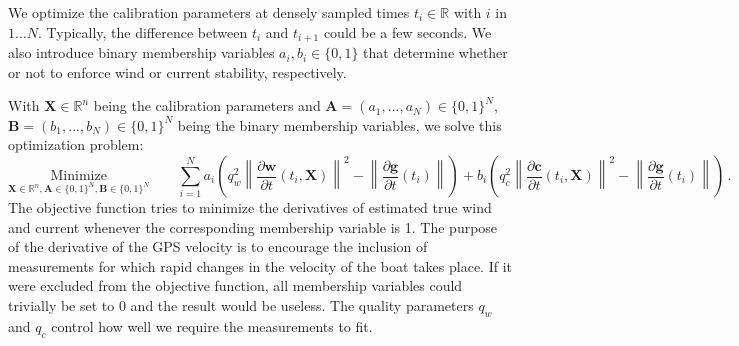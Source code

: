 \documentclass{article}
\newcommand{\quality}[1]{q_{#1}}
\newcommand{\realvec}[1]{\mathbf{#1}}
\newcommand{\norm}[1]{\left\| #1 \right\|}
\newcommand{\derivative}[2]{\frac{\partial #1}{\partial #2}}
\newcommand{\timederivative}[1]{\derivative{#1}{t}}
\newcommand{\realnumber}{\mathbb{R}}
\begin{document}
We optimize the calibration parameters at densely sampled times $t_i \in \realnumber$ with $i$ in $1 \ldots N$. Typically, the difference between $t_i$ and $t_{i+1}$ could be a few seconds. We also introduce binary membership variables $a_i, b_i \in \{0, 1\}$ that determine whether or not to enforce wind or current stability, respectively.

With $\realvec{X} \in \realnumber^n$ being the calibration parameters and $\realvec{A} = (a_1, ..., a_N) \in \{0, 1\}^N$, $\realvec{B} = (b_1, ..., b_N) \in \{0, 1\}^N$ being the binary membership variables, we solve this optimization problem:
\begin{displaymath}
\underset{\realvec{X} \in \realnumber^n, \realvec{A} \in \{0, 1\}^N, \realvec{B} \in \{0, 1\}^N}{\text{Minimize}} \qquad \sum_{i = 1}^N  a_i\left(  \quality{w}^2\norm{\timederivative{\realvec{w}}(t_i, \realvec{X})}^2 - \norm{\timederivative{\realvec{g}}(t_i)} \right)
+ b_i\left( \quality{c}^2\norm{\timederivative{\realvec{c}}(t_i, \realvec{X})}^2 - \norm{\timederivative{\realvec{g}}(t_i)}\right) \, .
\end{displaymath}
The objective function tries to minimize the derivatives of estimated true wind and current whenever the corresponding membership variable is 1. The purpose of the derivative of the GPS velocity is to encourage the inclusion of measurements for which rapid changes in the velocity of the boat takes place. If it were excluded from the objective function, all membership variables could trivially be set to 0 and the result would be useless. The quality parameters $\quality{w}$ and $\quality{c}$ control how well we require the measurements to fit.
\end{document}
